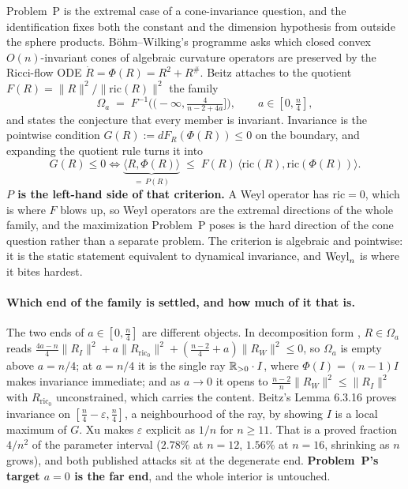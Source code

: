 Problem~P is the extremal case of a cone-invariance question, and the identification fixes both the constant and the dimension hypothesis from outside the sphere products. B\"ohm--Wilking's programme asks which closed convex $O(n)$-invariant cones of algebraic curvature operators are preserved by the Ricci-flow ODE $\dot R=\Phi(R)=R^2+R^{\#}$. Beitz \cite{beitz2018} attaches to the quotient $F(R)=\|R\|^2/\|\mathrm{ric}(R)\|^2$ the family
\[
\Omega_a\;=\;F^{-1}\Big(\big(-\infty,\tfrac4{n-2+4a}\big]\Big),\qquad a\in[0,\tfrac n4],
\]
and states the conjecture that every member is invariant. Invariance is the pointwise condition $G(R):=dF_R(\Phi(R))\le0$ on the boundary, and expanding the quotient rule turns it into
\begin{equation}\label{eq:criterion}
G(R)\le0\iff\underbrace{\langle R,\Phi(R)\rangle}_{=\,P(R)}\;\le\;F(R)\,\big\langle\mathrm{ric}(R),\mathrm{ric}(\Phi(R))\big\rangle .
\end{equation}
\textbf{$P$ is the left-hand side of that criterion.} A Weyl operator has $\mathrm{ric}=0$, which is where $F$ blows up, so Weyl operators are the extremal directions of the whole family, and the maximization Problem~P poses is the hard direction of the cone question rather than a separate problem. The criterion is algebraic and pointwise: it is the static statement equivalent to dynamical invariance, and $\mathrm{Weyl}_n$ is where it bites hardest.

\paragraph{Which end of the family is settled, and how much of it that is.} The two ends of $a\in[0,\tfrac n4]$ are different objects. In decomposition form \cite[p.~96]{beitz2018}, $R\in\Omega_a$ reads $\tfrac{4a-n}4\|R_I\|^2+a\|R_{\mathrm{ric}_0}\|^2+(\tfrac{n-2}4+a)\|R_W\|^2\le0$, so $\Omega_a$ is empty above $a=n/4$; at $a=n/4$ it is the single ray $\mathbb{R}_{>0}\cdot I$, where $\Phi(I)=(n-1)I$ makes invariance immediate; and as $a\to0$ it opens to $\tfrac{n-2}n\|R_W\|^2\le\|R_I\|^2$ with $R_{\mathrm{ric}_0}$ unconstrained, which carries the content. Beitz's Lemma 6.3.16 proves invariance on $[\tfrac n4-\varepsilon,\tfrac n4]$, a neighbourhood of the ray, by showing $I$ is a local maximum of $G$. Xu \cite{xu2024} makes $\varepsilon$ explicit as $1/n$ for $n\ge11$. That is a proved fraction $4/n^2$ of the parameter interval ($2.78\%$ at $n=12$, $1.56\%$ at $n=16$, shrinking as $n$ grows), and both published attacks sit at the degenerate end. \textbf{Problem~P's target $a=0$ is the far end}, and the whole interior is untouched.

